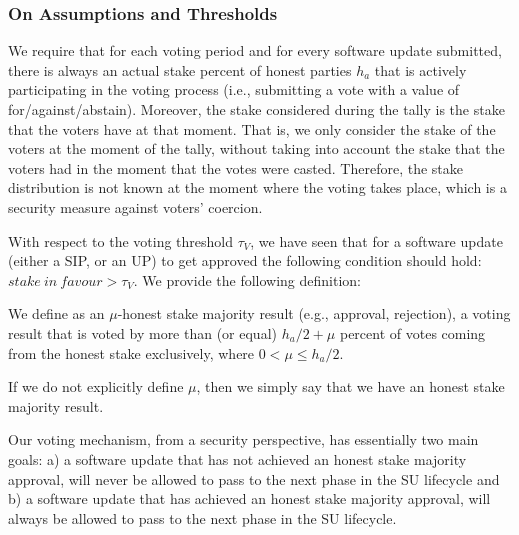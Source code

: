 \subsubsection{On Assumptions and Thresholds}
We require that for each voting period and for every software update submitted, there is always an actual stake percent of  honest parties $h_a$ that is actively participating in the voting process (i.e., submitting a vote with a value of for/against/abstain).
Moreover, the stake considered during the tally is the stake that the voters have at that moment. That is, we only consider the stake of the voters at the moment of the tally, without taking into account the stake that the voters had in the moment that the votes were casted. Therefore, the stake distribution is not known at the moment where the voting takes place, which is a security measure against voters' coercion.

With respect to the voting threshold $\tau_V$, we have seen that for a software update (either a SIP, or an UP) to get approved the following condition should hold: $stake\ in\ favour > \tau_V$. We provide the following definition:
\begin{definition}
We define as an $\mu$-honest stake majority result (e.g., approval, rejection), a voting result that is voted by more than (or equal) $h_a/2 + \mu$ percent of votes coming from the honest stake exclusively, where $0 < \mu \leq h_a/2$.

If we do not explicitly define $\mu$, then we simply say that we have an honest stake majority result. 
\end{definition}
Our voting mechanism, from a security perspective, has essentially two main goals: a) a software update that has not achieved an honest stake majority approval, will never be allowed to pass to the next phase in the SU lifecycle and b) a software update that has achieved an honest stake majority approval, will always be allowed to pass to the next phase in the SU lifecycle.

